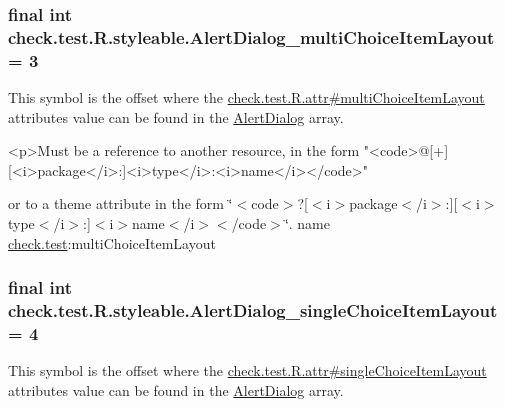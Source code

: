 \subsubsection[{Alert\+Dialog\+\_\+multi\+Choice\+Item\+Layout}]{\setlength{\rightskip}{0pt plus 5cm}final int check.\+test.\+R.\+styleable.\+Alert\+Dialog\+\_\+multi\+Choice\+Item\+Layout = 3\hspace{0.3cm}{\ttfamily [static]}}\label{classcheck_1_1test_1_1_r_1_1styleable_ae3a136130119ae9ebf31f7eb82968d0d}
This symbol is the offset where the \hyperlink{classcheck_1_1test_1_1_r_1_1attr_adbcd6700f598b96667bb355328873eee}{check.\+test.\+R.\+attr\#multi\+Choice\+Item\+Layout} attribute\textquotesingle{}s value can be found in the \hyperlink{classcheck_1_1test_1_1_r_1_1styleable_a1d9c160813dfdd546911e783935ebb65}{Alert\+Dialog} array.

\begin{DoxyVerb}      <p>Must be a reference to another resource, in the form "<code>@[+][<i>package</i>:]<i>type</i>:<i>name</i></code>"
\end{DoxyVerb}
 or to a theme attribute in the form \char`\"{}$<$code$>$?\mbox{[}$<$i$>$package$<$/i$>$\+:\mbox{]}\mbox{[}$<$i$>$type$<$/i$>$\+:\mbox{]}$<$i$>$name$<$/i$>$$<$/code$>$\char`\"{}.  name \hyperlink{namespacecheck_1_1test}{check.\+test}\+:multi\+Choice\+Item\+Layout \hypertarget{classcheck_1_1test_1_1_r_1_1styleable_a6be8c6aa13def4b95a7fa4ed71c5bda9}{}
\subsubsection[{Alert\+Dialog\+\_\+single\+Choice\+Item\+Layout}]{\setlength{\rightskip}{0pt plus 5cm}final int check.\+test.\+R.\+styleable.\+Alert\+Dialog\+\_\+single\+Choice\+Item\+Layout = 4\hspace{0.3cm}{\ttfamily [static]}}\label{classcheck_1_1test_1_1_r_1_1styleable_a6be8c6aa13def4b95a7fa4ed71c5bda9}
This symbol is the offset where the \hyperlink{classcheck_1_1test_1_1_r_1_1attr_adf3a7eab0f546f495a660d306b9f17fd}{check.\+test.\+R.\+attr\#single\+Choice\+Item\+Layout} attribute\textquotesingle{}s value can be found in the \hyperlink{classcheck_1_1test_1_1_r_1_1styleable_a1d9c160813dfdd546911e783935ebb65}{Alert\+Dialog} array.

